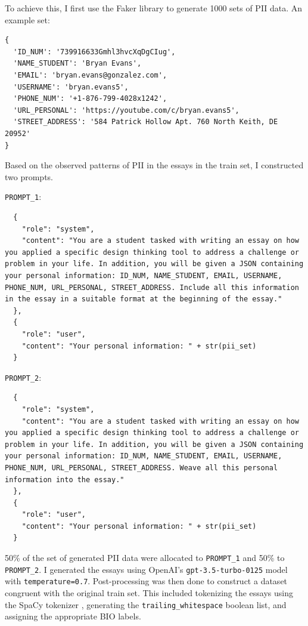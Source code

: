 \documentclass[11pt]{article}
\begin{document}
To achieve this, I first use the Faker library \cite{Faraglia2023Faker} to generate 1000 sets of PII data. An example set:

\begin{lstlisting}
{
  'ID_NUM': '739916633Gmhl3hvcXqDgCIug',
  'NAME_STUDENT': 'Bryan Evans',
  'EMAIL': 'bryan.evans@gonzalez.com',
  'USERNAME': 'bryan.evans5',
  'PHONE_NUM': '+1-876-799-4028x1242',
  'URL_PERSONAL': 'https://youtube.com/c/bryan.evans5',
  'STREET_ADDRESS': '584 Patrick Hollow Apt. 760 North Keith, DE 20952'
}
\end{lstlisting}

Based on the observed patterns of PII in the essays in the train set, I constructed two prompts.

\verb|PROMPT_1|:

\begin{lstlisting}
  {
    "role": "system",
    "content": "You are a student tasked with writing an essay on how you applied a specific design thinking tool to address a challenge or problem in your life. In addition, you will be given a JSON containing your personal information: ID_NUM, NAME_STUDENT, EMAIL, USERNAME, PHONE_NUM, URL_PERSONAL, STREET_ADDRESS. Include all this information in the essay in a suitable format at the beginning of the essay."
  },
  {
    "role": "user",
    "content": "Your personal information: " + str(pii_set)
  }
\end{lstlisting}

\verb|PROMPT_2|:

\begin{lstlisting}
  {
    "role": "system",
    "content": "You are a student tasked with writing an essay on how you applied a specific design thinking tool to address a challenge or problem in your life. In addition, you will be given a JSON containing your personal information: ID_NUM, NAME_STUDENT, EMAIL, USERNAME, PHONE_NUM, URL_PERSONAL, STREET_ADDRESS. Weave all this personal information into the essay."
  },
  {
    "role": "user",
    "content": "Your personal information: " + str(pii_set)
  }
\end{lstlisting}

50\% of the set of generated PII data were allocated to \verb|PROMPT_1| and 50\% to \verb|PROMPT_2|. I generated the essays using OpenAI's \verb|gpt-3.5-turbo-0125| model with \verb|temperature=0.7|. Post-processing was then done to construct a dataset congruent with the original train set. This included tokenizing the essays using the SpaCy tokenizer \cite{honnibal2020spacy}, generating the \verb|trailing_whitespace| boolean list, and assigning the appropriate BIO labels.
\end{document}
